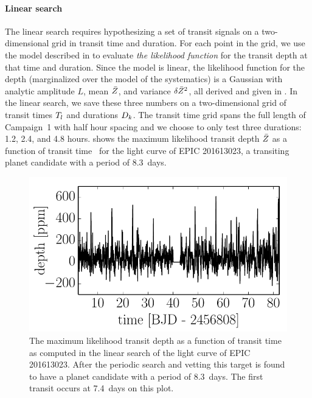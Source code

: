 \paragraph{Linear search}

The linear search requires hypothesizing a set of transit signals on a
two-dimensional grid in transit time and duration.
For each point in the grid, we use the model described in  to
evaluate \emph{the likelihood function} for the transit depth at that time
and duration.
Since the model is linear, the likelihood function for the depth (marginalized
over the model of the systematics) is a Gaussian with analytic amplitude $L$,
mean $\bar{{Z}}$, and variance $\delta\bar{{Z}}^2$, all derived and given in
.
In the linear search, we save these three numbers on a
two-dimensional grid of transit times ${T}_l$ and durations
${D}_k$.
The transit time grid spans the full length of Campaign~1 with half hour spacing
and we choose to only test three durations: 1.2, 2.4, and 4.8 hours.
 shows the maximum likelihood transit depth $\bar{{Z}}$ as a
function of transit time \transittime\ for the light curve of EPIC 201613023,
a transiting planet candidate with a period of 8.3~days.

\begin{figure}[p]
\begin{center}
\includegraphics{figures/ketu/linear.pdf}
\end{center}
\caption{%
The maximum likelihood transit depth as a function of transit time as computed
in the linear search of the light curve of EPIC 201613023.
After the periodic search and vetting this target is found to have a planet
candidate with a period of 8.3~days.
The first transit occurs at 7.4~days on this plot.
}
\end{figure}



